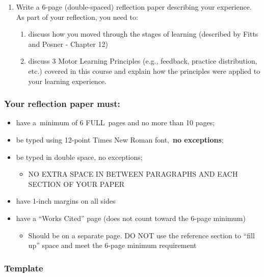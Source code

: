 \documentclass[
  letterpaper,
  DIV=11,
  numbers=noendperiod]{scrartcl}
\providecommand{\tightlist}{%
  \setlength{\itemsep}{0pt}\setlength{\parskip}{0pt}}\usepackage{longtable,booktabs,array}
\begin{document}
\begin{enumerate}
\def\labelenumi{\arabic{enumi}.}
\item
  Write a 6-page (double-spaced) reflection paper describing your
  experience. As part of your reflection, you need to:

  \begin{enumerate}
  \def\labelenumii{\arabic{enumii}.}
  \item
    discuss how you moved through the stages of learning (described by
    Fitts and Posner - Chapter 12)
  \item
    discuss 3 Motor Learning Principles (e.g., feedback, practice
    distribution, etc.) covered in this course and explain how the
    principles were applied to your learning experience.
  \end{enumerate}
\end{enumerate}

\hypertarget{your-reflection-paper-must}{%
\subsubsection{Your reflection paper
must:}\label{your-reflection-paper-must}}

\begin{itemize}
\tightlist
\item
  have a~minimum of 6 FULL~pages and no more than 10 pages;
\item
  be typed using 12-point Times New Roman font,~\textbf{no exceptions};
\item
  be typed in double space, no exceptions;

  \begin{itemize}
  \tightlist
  \item
    NO EXTRA SPACE IN BETWEEN PARAGRAPHS AND EACH SECTION OF YOUR PAPER
  \end{itemize}
\item
  have 1-inch margins on all sides
\item
  have a ``Works Cited'' page (does not count toward the 6-page minimum)

  \begin{itemize}
  \tightlist
  \item
    Should be on a separate page. DO NOT use the reference section to
    ``fill up'' space and meet the 6-page minimum requirement
  \end{itemize}
\end{itemize}

\hypertarget{template}{%
\subsubsection{Template}\label{template}}
\end{document}
